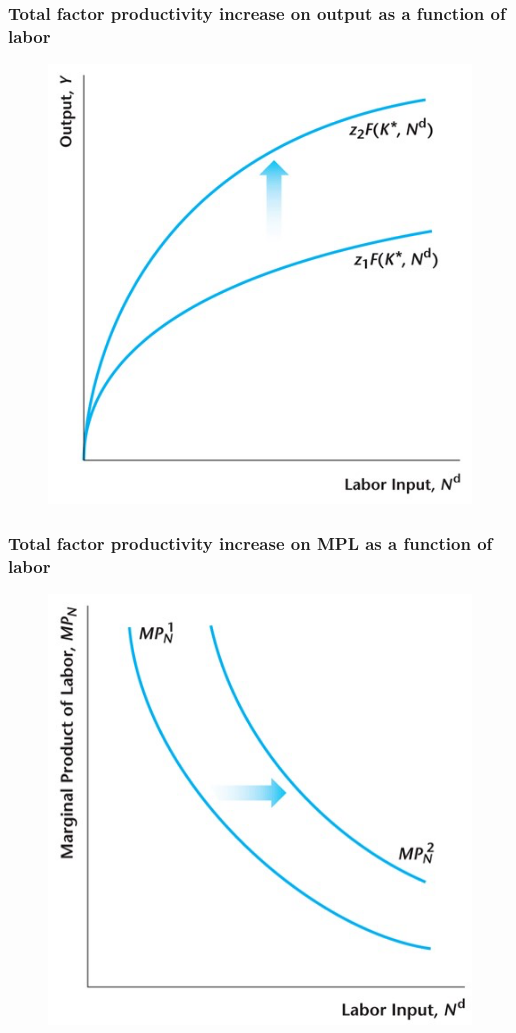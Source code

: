 \documentclass{beamer}
\begin{document}
\begin{frame}
\frametitle[alignment=center]{Total factor productivity increase on output as a function of labor}
\begin{figure}
\centering
\includegraphics[scale=0.5]{Figures/W_Fig_4pt16.png}
\end{figure}
\end{frame}

\begin{frame}
\frametitle[alignment=center]{Total factor productivity increase on MPL as a function of labor}
\begin{figure}
\centering
\includegraphics[scale=0.5]{Figures/W_Fig_4pt17.png}
\end{figure}
\end{frame}
\end{document}
